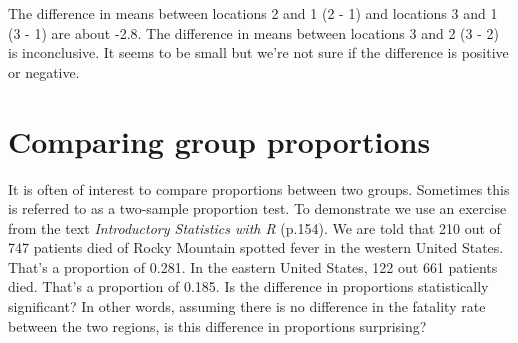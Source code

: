 \documentclass[
]{book}
\newenvironment{Shaded}{\begin{snugshade}}{\end{snugshade}}
\newcommand{\AttributeTok}[1]{\textcolor[rgb]{0.77,0.63,0.00}{#1}}
\newcommand{\DecValTok}[1]{\textcolor[rgb]{0.00,0.00,0.81}{#1}}
\newcommand{\FloatTok}[1]{\textcolor[rgb]{0.00,0.00,0.81}{#1}}
\newcommand{\FunctionTok}[1]{\textcolor[rgb]{0.00,0.00,0.00}{#1}}
\newcommand{\NormalTok}[1]{#1}
\newcommand{\SpecialCharTok}[1]{\textcolor[rgb]{0.00,0.00,0.00}{#1}}
\begin{document}
\begin{Shaded}
\end{Shaded}

The difference in means between locations 2 and 1 (2 - 1) and locations 3 and 1 (3 - 1) are about -2.8. The difference in means between locations 3 and 2 (3 - 2) is inconclusive. It seems to be small but we're not sure if the difference is positive or negative.

\hypertarget{comparing-group-proportions}{%
\section{Comparing group proportions}\label{comparing-group-proportions}}

It is often of interest to compare proportions between two groups. Sometimes this is referred to as a two-sample proportion test. To demonstrate we use an exercise from the text \emph{Introductory Statistics with R} \citep{Dalgaard_2020} (p.154). We are told that 210 out of 747 patients died of Rocky Mountain spotted fever in the western United States. That's a proportion of 0.281. In the eastern United States, 122 out 661 patients died. That's a proportion of 0.185. Is the difference in proportions statistically significant? In other words, assuming there is no difference in the fatality rate between the two regions, is this difference in proportions surprising?
\end{document}
